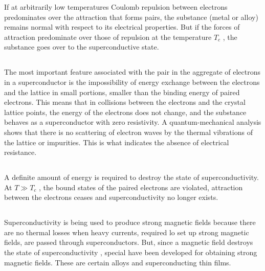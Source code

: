 If at arbitrarily low temperatures Coulomb repulsion between
electrons predominates over the attraction that forms pairs,
the substance (metal or alloy) remains normal with respect to its electrical properties. But if the forces of attraction predominate over those of repulsion at the temperature $T_{c}$ , the substance goes over to the superconductive state.

\subsection{}\label{41.6.8} The most important feature associated with the pair in the aggregate of electrons in a superconductor is the impossibility of energy exchange between the electrons and the lattice in small portions, smaller than the binding energy of paired electrons. This means that in collisions between the electrons and the crystal lattice points, the energy of the electrons does not change, and the substance behaves as a superconductor with zero resistivity. A quantum-mechanical analysis shows that there is no scattering of electron waves by the thermal vibrations of the lattice or impurities. This is what indicates the absence of electrical resistance.

\subsection{}\label{41.6.9} A definite amount of energy is required to destroy the state of superconductivity. At $T \gg T_{c}$ , the bound states of the paired electrons are violated, attraction between the electrons ceases and superconductivity no longer exists.

\subsection{}\label{41.6.10} Superconductivity is being used to produce strong magnetic fields because there are no thermal losses when heavy currents, required lo set up strong magnetic fields, are passed through superconductors. But, since a magnetic field destroys the state of superconductivity , special  have been developed for obtaining strong magnetic fields. These are certain alloys and superconducting thin films.

